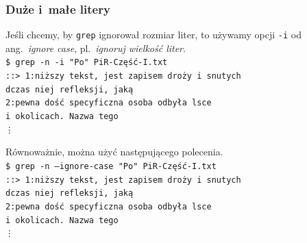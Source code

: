 \documentclass[10pt,t]{beamer}
\begin{document}
\begin{frame}
  \frametitle{Duże i~małe litery}


  Jeśli chcemy, by \texttt{grep} ignorował rozmiar liter, to używamy
  opcji \texttt{-i} od ang.~\textit{ignore case}, pl.~\textit{ignoruj
    wielkość liter}. \\
  \texttt{\$ grep -n -i "Po"{} PiR-Część-I.txt} \\
  \texttt{::> 1:niższy tekst, jest zapisem
    droży i~snutych} \\
  \texttt{dczas niej refleksji, jaką} \\
  \texttt{2:pewna dość specyficzna osoba odbyła 
    lsce} \\
  \texttt{i~okolicach. Nazwa tego} \\
  \hspace{2em} \texttt{\vdots}

  Równoważnie, można użyć następującego polecenia. \\
  \texttt{\$ grep -n --ignore-case "Po"{} PiR-Część-I.txt} \\
  \texttt{::> 1:niższy tekst, jest zapisem
    droży i~snutych} \\
  \texttt{dczas niej refleksji, jaką} \\
  \texttt{2:pewna dość specyficzna osoba odbyła 
    lsce} \\
  \texttt{i~okolicach. Nazwa tego} \\
  \hspace{2em} \texttt{\vdots}

\end{frame}
\end{document}
